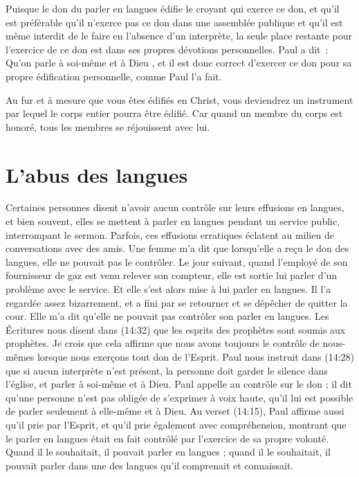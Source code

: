 Puisque le don du parler en langues édifie le croyant qui exerce ce don,
 et qu'il est préférable qu'il n'exerce pas ce don dans une assemblée publique
 et qu'il est même interdit de le faire en l'absence d'un interprète,
 la seule place restante pour l'exercice de ce don est dans ses propres
 dévotions personnelles. Paul a dit~:
 \og Qu'on parle à soi-même et à Dieu \fg{}, et il est donc correct
 d'exercer ce don pour sa propre édification personnelle, comme Paul l'a fait.

Au fur et à mesure que vous êtes édifiés en Christ, vous deviendrez
 un instrument par lequel le corps entier pourra être édifié.
 Car quand un membre du corps est honoré, tous les membres
 se réjouissent avec lui.


\section{L'abus des langues}

Certaines personnes disent n'avoir aucun contrôle sur leurs effusions
 en langues, et bien souvent, elles se mettent à parler en langues
 pendant un service public, interrompant le sermon.
 Parfois, ces effusions erratiques éclatent au milieu de conversations
 avec des amis. Une femme m'a dit que lorsqu'elle a reçu le don des langues,
 elle ne pouvait pas le contrôler. Le jour suivant, quand l'employé de son
 fournisseur de gaz est venu relever son compteur, elle est sortie
 lui parler d'un problème avec le service. Et elle s'est alors mise
 à lui parler en langues. Il l'a regardée assez bizarrement,
 et a fini par se retourner et se dépêcher de quitter la cour.
 Elle m'a dit qu'elle ne pouvait pas contrôler son parler en langues.
 Les Écritures nous disent dans (14:32) que les esprits
 des prophètes sont soumis aux prophètes. Je crois que cela affirme
 que nous avons toujours le contrôle de nous-mêmes lorsque nous exerçons
 tout don de l'Esprit. Paul nous instruit dans (14:28)
 que si aucun interprète n'est présent, la personne doit garder
 le silence dans l'église, et parler à soi-même et à Dieu.
 Paul appelle au contrôle sur le don ; il dit qu'une personne n'est pas
 obligée de s'exprimer à voix haute, qu'il lui est possible de parler
 seulement à elle-même et à Dieu. Au verset (14:15),
 Paul affirme aussi qu'il prie par l'Esprit, et qu'il prie également
 avec compréhension, montrant que le parler en langues était en fait
 contrôlé par l'exercice de sa propre volonté. Quand il le souhaitait,
 il pouvait parler en langues ; quand il le souhaitait, il pouvait parler
 dans une des langues qu'il comprenait et connaissait.

